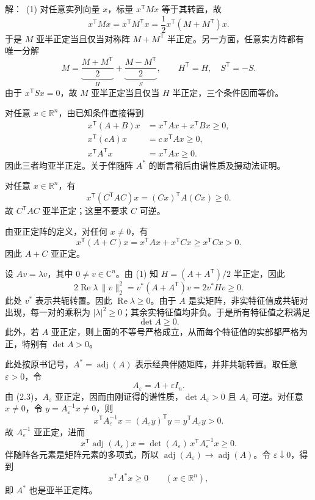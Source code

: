 \documentclass[11pt,a4paper]{article}
\DeclareMathOperator{\adj}{adj}
\newcommand{\sol}{\par\noindent 解：\ }
\begin{document}
\sol{(1)} 对任意实列向量 $x$，标量 $x^{\mathsf T}Mx$ 等于其转置，故
\[
 x^{\mathsf T}Mx=x^{\mathsf T}M^{\mathsf T}x
   =\frac12 x^{\mathsf T}(M+M^{\mathsf T})x.
\]
于是 $M$ 亚半正定当且仅当对称阵 $M+M^{\mathsf T}$ 半正定。另一方面，任意实方阵都有唯一分解
\[
 M=\underbrace{\frac{M+M^{\mathsf T}}2}_{H}
   +\underbrace{\frac{M-M^{\mathsf T}}2}_{S},
 \qquad H^{\mathsf T}=H,\quad S^{\mathsf T}=-S.
\]
由于 $x^{\mathsf T}Sx=0$，故 $M$ 亚半正定当且仅当 $H$ 半正定，三个条件因而等价。

\par\smallskip{} 对任意 $x\in\mathbb R^n$，由已知条件直接得到
\[
\begin{aligned}
 x^{\mathsf T}(A+B)x&=x^{\mathsf T}Ax+x^{\mathsf T}Bx\geq0,\\
 x^{\mathsf T}(cA)x&=c\,x^{\mathsf T}Ax\geq0,\\
 x^{\mathsf T}A^{\mathsf T}x&=x^{\mathsf T}Ax\geq0.
\end{aligned}
\]
因此三者均亚半正定。关于伴随阵 $A^*$ 的断言稍后由谱性质及摄动法证明。

\par\smallskip{} 对任意 $x\in\mathbb R^n$，有
\[
 x^{\mathsf T}(C^{\mathsf T}AC)x
  =(Cx)^{\mathsf T}A(Cx)\geq0.
\]
故 $C^{\mathsf T}AC$ 亚半正定；这里不要求 $C$ 可逆。

\par\smallskip{} 由亚正定阵的定义，对任何 $x\neq0$，有
\[
 x^{\mathsf T}(A+C)x=x^{\mathsf T}Ax+x^{\mathsf T}Cx
  \geq x^{\mathsf T}Cx>0.
\]
因此 $A+C$ 亚正定。

\par\smallskip{} 设 $Av=\lambda v$，其中 $0\neq v\in\mathbb C^n$。由 (1) 知 $H=(A+A^{\mathsf T})/2$ 半正定，因此
\[
 2\operatorname{Re}\lambda\,\lVert v\rVert_2^2
 =v^*(A+A^{\mathsf T})v
 =2v^*Hv\geq0.
\]
此处 $v^*$ 表示共轭转置。因此 $\operatorname{Re}\lambda\geq0$。由于 $A$ 是实矩阵，非实特征值成共轭对出现，每一对的乘积为 $|\lambda|^2\geq0$；其余实特征值均非负。于是所有特征值之积满足
\[
 {\det A\geq0}.
\]
此外，若 $A$ 亚正定，则上面的不等号严格成立，从而每个特征值的实部都严格为正，特别有 $\det A>0$。

\par\smallskip{} 此处按原书记号，$A^*=\adj(A)$ 表示{经典伴随矩阵}，并非共轭转置。取任意 $\varepsilon>0$，令
\[
 A_\varepsilon=A+\varepsilon I_n.
\]
由 (2.3)，$A_\varepsilon$ 亚正定，因而由刚证得的谱性质，$\det A_\varepsilon>0$ 且 $A_\varepsilon$ 可逆。对任意 $x\neq0$，令 $y=A_\varepsilon^{-1}x\neq0$，则
\[
 x^{\mathsf T}A_\varepsilon^{-1}x
 =(A_\varepsilon y)^{\mathsf T}y
 =y^{\mathsf T}A_\varepsilon y>0.
\]
故 $A_\varepsilon^{-1}$ 亚正定，进而
\[
 x^{\mathsf T}\adj(A_\varepsilon)x
 =\det(A_\varepsilon)\,x^{\mathsf T}A_\varepsilon^{-1}x\geq0.
\]
伴随阵各元素是矩阵元素的多项式，所以 $\adj(A_\varepsilon)\to\adj(A)$。令 $\varepsilon\downarrow0$，得到
\[
 x^{\mathsf T}A^*x\geq0\qquad(x\in\mathbb R^n),
\]
即 $A^*$ 也是亚半正定阵。
\end{document}
